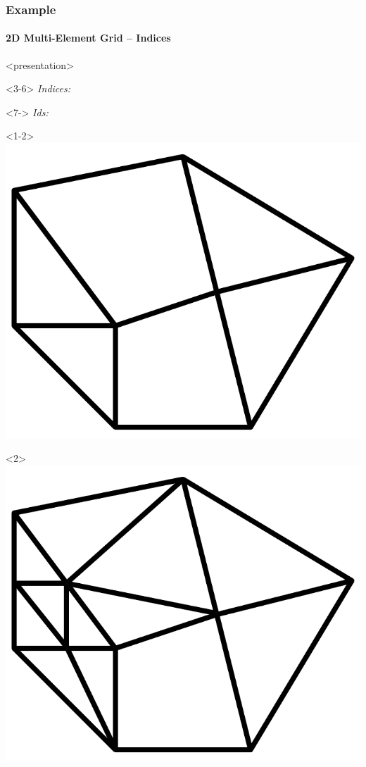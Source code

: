 \documentclass[ignorenonframetext,11pt]{beamer}
\theoremstyle{definition}
\begin{document}
\begin{frame}
  \frametitle{Example}
  \framesubtitle{2D Multi-Element Grid -- Indices}

  \begin{onlyenv}<presentation>
    \vspace*{2ex}
    \begin{overlayarea}{\linewidth}{3ex}
      \medskip
      \begin{onlyenv}<3-6> \emph{Indices:}
      \end{onlyenv}
      \begin{onlyenv}<7-> \emph{Ids:}
      \end{onlyenv}
    \end{overlayarea}
  \end{onlyenv}

  \begin{overlayarea}{\linewidth}{0.45\linewidth}
    \begin{center}

    \begin{onlyenv}<1-2>
      \includegraphics[width=0.4\linewidth]{index-grid0}
      \hfill
      \begin{onlyenv}<2>
        \includegraphics[width=0.4\linewidth]{index-grid1}\par
      \end{onlyenv}
    \end{onlyenv}


\end{center}
\end{overlayarea}
\end{frame}
\end{document}
